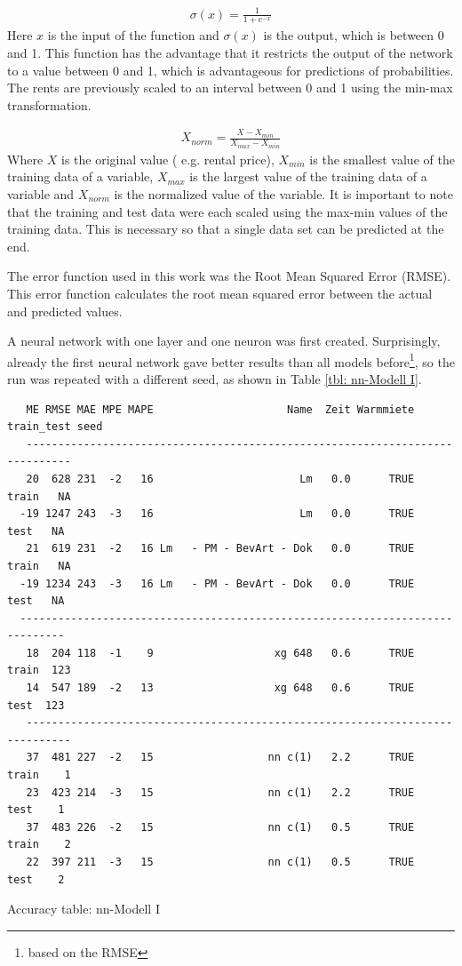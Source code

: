 \begin{align}\label{Formel: logistic}
	\sigma(x) = \frac{1}{1 + e^{-x}}
\end{align} 
Here $x$ is the input of the function and $\sigma(x)$ is the output, which is between 0 and 1. This function has the advantage that it restricts the output of the network to a value between 0 and 1, which is advantageous for predictions of probabilities. The rents are previously scaled to an interval between 0 and 1 using the min-max transformation.

\begin{align}
	X_{norm} = \frac{X - X_{min}}{X_{max} - X_{min}}
\end{align}
Where $X$ is the original value ( e.g. rental price), $X_{min}$ is the smallest value of the training data of a variable, $X_{max}$ is the largest value of the training data of a variable and $X_{norm}$ is the normalized value of the variable. It is important to note that the training and test data were each scaled using the max-min values of the training data. This is necessary so that a single data set can be predicted at the end.

The error function used in this work was the Root Mean Squared Error (RMSE). This error function calculates the root mean squared error between the actual and predicted values. 

A neural network with one layer and one neuron was first created. Surprisingly, already the first neural network gave better results than all models before\footnote{based on the RMSE}, so the run was repeated with a different seed, as shown in Table \ref{tbl: nn-Modell I}. 

\begin{table}[H]
	\begin{verbatim}
   ME RMSE MAE MPE MAPE                     Name  Zeit Warmmiete train_test seed
   -----------------------------------------------------------------------------
   20  628 231  -2   16                       Lm   0.0      TRUE      train   NA
  -19 1247 243  -3   16                       Lm   0.0      TRUE       test   NA
   21  619 231  -2   16 Lm   - PM - BevArt - Dok   0.0      TRUE      train   NA
  -19 1234 243  -3   16 Lm   - PM - BevArt - Dok   0.0      TRUE       test   NA
  -----------------------------------------------------------------------------
   18  204 118  -1    9                   xg 648   0.6      TRUE      train  123
   14  547 189  -2   13                   xg 648   0.6      TRUE       test  123
   -----------------------------------------------------------------------------
   37  481 227  -2   15                  nn c(1)   2.2      TRUE      train    1
   23  423 214  -3   15                  nn c(1)   2.2      TRUE       test    1
   37  483 226  -2   15                  nn c(1)   0.5      TRUE      train    2
   22  397 211  -3   15                  nn c(1)   0.5      TRUE       test    2	
	\end{verbatim}
	\caption{Accuracy table: nn-Modell I}
	\label{tbl: nn-Modell I}
\end{table}

